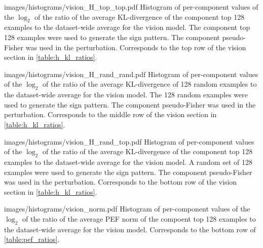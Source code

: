 \documentclass[dvipsnames]{article}
\begin{document}
\appendixhistogram
{images/histograms/vision_H_top_top.pdf}
{Histogram of per-component values of the $\log_2$ of the ratio of the average KL-divergence of the component top 128 examples to the dataset-wide average for the vision model.
The component top 128 examples were used to generate the sign pattern.
The component pseudo-Fisher was used in the perturbation.
Corresponds to the top row of the vision section in \cref{table:h_kl_ratios}.}

\appendixhistogram
{images/histograms/vision_H_rand_rand.pdf}
{Histogram of per-component values of the $\log_2$ of the ratio of the average KL-divergence of 128 random examples to the dataset-wide average for the vision model.
The 128 random examples were used to generate the sign pattern.
The component pseudo-Fisher was used in the perturbation.
Corresponds to the middle row of the vision section in \cref{table:h_kl_ratios}.}

\appendixhistogram
{images/histograms/vision_H_rand_top.pdf}
{Histogram of per-component values of the $\log_2$ of the ratio of the average KL-divergence of the component top 128 examples to the dataset-wide average for the vision model.
A random set of 128 examples were used to generate the sign pattern.
The component pseudo-Fisher was used in the perturbation.
Corresponds to the bottom row of the vision section in \cref{table:h_kl_ratios}.}




\appendixhistogram
{images/histograms/vision_norm.pdf}
{Histogram of per-component values of the $\log_2$ of the ratio of the average PEF norm of the compoent top 128 examples to the dataset-wide average for the vision model.
Corresponds to the bottom row of \cref{table:pef_ratios}.}
\end{document}
